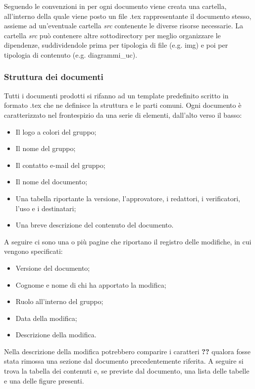 Seguendo le convenzioni in  per ogni documento viene creata una cartella, all'interno della quale viene posto
un file .tex rappresentante il documento stesso, assieme ad un'eventuale cartella \emph{src} contenente le diverse risorse necessarie.
La cartella \emph{src} può contenere altre sottodirectory per meglio organizzare le dipendenze, suddividendole prima per tipologia di file
(e.g. img) e poi per tipologia di contenuto (e.g. diagrammi\_uc).

\subsubsection{Struttura dei documenti}
\label{ssub:struttura_doc}

Tutti i documenti prodotti si rifanno ad un template predefinito scritto in formato .tex che ne definisce la struttura
e le parti comuni. Ogni documento è caratterizzato nel frontespizio da una serie di elementi, dall'alto verso il basso:
\begin{itemize}
    \item Il logo a colori del gruppo;
    \item Il nome del gruppo;
    \item Il contatto e-mail del gruppo;
    \item Il nome del documento;
    \item Una tabella riportante la versione, l'approvatore, i redattori, i verificatori, l'uso e i destinatari;
    \item Una breve descrizione del contenuto del documento.
\end{itemize}
A seguire ci sono una o più pagine che riportano il registro delle modifiche, in cui vengono specificati:
\begin{itemize}
    \item Versione del documento;
    \item Cognome e nome di chi ha apportato la modifica;
    \item Ruolo all'interno del gruppo;
    \item Data della modifica;
    \item Descrizione della modifica.
\end{itemize}
Nella descrizione della modifica potrebbero comparire i caratteri \textbf{??} qualora fosse stata rimossa una sezione dal documento
precedentemente riferita.
A seguire si trova la tabella dei contenuti e, se previste dal documento, una lista delle tabelle e una delle figure presenti.\\
